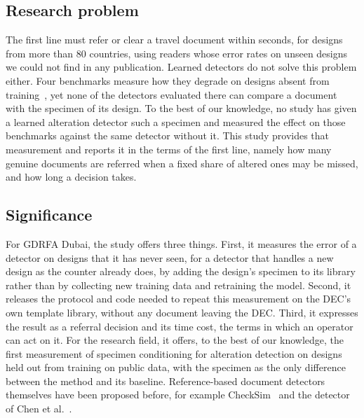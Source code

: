 \documentclass[12pt,a4paper]{article}
\begin{document}
\subsection{Research problem}
The first line must refer or clear a travel document within seconds, for designs from more than 80 countries, using readers whose error rates on unseen designs we could not find in any publication. Learned detectors do not solve this problem either. Four benchmarks measure how they degrade on designs absent from training~\cite{boned2024sidtd,guan2024idnetarxiv,korshunov2025fantasyid,korshunov2025deepid}, yet none of the detectors evaluated there can compare a document with the specimen of its design. To the best of our knowledge, no study has given a learned alteration detector such a specimen and measured the effect on those benchmarks against the same detector without it. This study provides that measurement and reports it in the terms of the first line, namely how many genuine documents are referred when a fixed share of altered ones may be missed, and how long a decision takes.

\subsection{Significance}
For GDRFA Dubai, the study offers three things. First, it measures the error of a detector on designs that it has never seen, for a detector that handles a new design as the counter already does, by adding the design's specimen to its library rather than by collecting new training data and retraining the model. Second, it releases the protocol and code needed to repeat this measurement on the DEC's own template library, without any document leaving the DEC. Third, it expresses the result as a referral decision and its time cost, the terms in which an operator can act on it. For the research field, it offers, to the best of our knowledge, the first measurement of specimen conditioning for alteration detection on designs held out from training on public data, with the specimen as the only difference between the method and its baseline. Reference-based document detectors themselves have been proposed before, for example CheckSim~\cite{ghanmi2021checksim} and the detector of Chen et al.~\cite{chen2022domain}.
\end{document}
